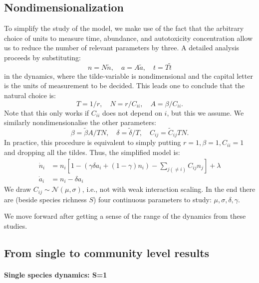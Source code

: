 \documentclass[11pt,a4paper,fleqn]{scrartcl}
\begin{document}
\subsection{Nondimensionalization}
To simplify the study of the model, we make use of the fact that the arbitrary choice of units to measure time, abundance, and autotoxicity concentration allow us to reduce the number of relevant parameters by three. A detailed analysis proceeds by substituting:
\begin{equation}
n = N\tilde{n}, \quad a = A\tilde{a}, \quad t= T\tilde{t}
\end{equation}
in the dynamics, where the tilde-variable is nondimensional and the capital letter is the units of measurement to be decided. This leads one to conclude that the natural choice is:
\begin{equation}
T = 1/r, \quad N= r/C_{ii}, \quad A=\beta/C_{ii}.
\end{equation}
Note that this only works if $C_{ii}$ does not depend on $i$, but this we assume. We similarly nondimensionalise the other parameters:
\begin{equation}
\beta = \tilde{\beta}A/TN, \quad \delta = \tilde{\delta}/T, \quad C_{ij} = \tilde{C}_{ij}TN.
\end{equation}
In practice, this procedure is equivalent to simply putting $r=1,\beta=1,C_{ii}=1$ and dropping all the tildes. Thus, the simplified model is:
\begin{align}
\label{eqnologspecies}
\dot{n}_i &= n_i\left[ 1 - \left(\gamma \delta a_i + (1-\gamma)n_i\right) - \sum_{j(\neq i)} C_{ij} n_j \right] + \lambda\\
\label{eqnologautotox}
\dot{a}_i &= n_i - \delta a_i
\end{align}
We draw $C_{ij}\sim \mathcal{N}(\mu,\sigma)$, i.e., not with weak interaction scaling. In the end there are (beside species richness $S$) four continuous parameters to study: $\mu,\sigma,\delta,\gamma$.

We move forward after getting a sense of the range of the dynamics from these studies.



\subsection{From single to community level results}
\date{May 2025}
\paragraph{Single species dynamics: S=1}
\end{document}
